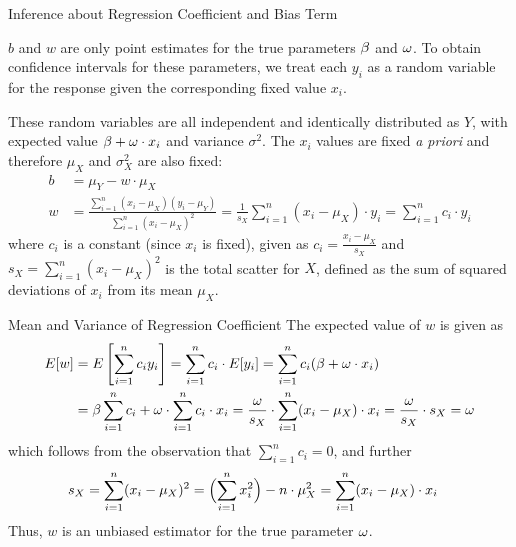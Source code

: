 \begin{frame}{Inference about Regression Coefficient and Bias Term}

$b$ and $w$
are only point estimates for the true parameters $\beta$ and $\omega$. To obtain
confidence intervals for these parameters, we treat each $y_i$ as a
random variable for the response given the corresponding fixed value
$x_i$.

\medskip

These random variables are all independent and identically distributed
as $Y$, with expected value $\beta + \omega \cdot x_i$ and variance
$\sigma^2$. 
	The $x_i$ values are fixed {\em a priori} and
therefore $\mu_X$ and $\sigma_X^2$ are also fixed:%
%
\begin{align*}
    b & = \mu_{Y} - w \cdot \mu_X\\
    w & = \frac{\sum^{n}_{i=1} (x_i - \mu_X)(y_{i}
    - \mu_{Y})}{ \sum^{n}_{i=1} (x_i - \mu_X)^2 } = \frac{1}{s_X} 
    \sum^{n}_{i=1} (x_i - \mu_X) \cdot y_{i}
        = \sum^{n}_{i=1} c_i \cdot y_i
\end{align*}
where $c_i$ is a constant (since $x_i$ is fixed), given as
$    c_i = \frac{x_i - \mu_X}{ s_X }$
and $s_X = \sum^{n}_{i=1} (x_i - \mu_X)^2$ is the total
scatter for $X$, defined as the sum of squared deviations of $x_i$ from
its mean $\mu_X$.
\end{frame}
%
\begin{frame}{Mean and Variance of Regression Coefficient}
The expected value of $w$ is given as
\begin{align*}
E[w] & = E\left[ \sum^{n}_{i=1} c_i y_i \right] = \sum^{n}_{i=1} c_i \cdot
    E[y_i] = \sum^{n}_{i=1} c_i (\beta+\omega\cdot x_i) \\
    & = \beta \sum^{n}_{i=1} c_i + \omega \cdot \sum^{n}_{i=1} c_i \cdot x_i
    = \frac{\omega}{s_X} \cdot \sum^{n}_{i=1} (x_i - \mu_X) \cdot x_i
    = \frac{\omega}{s_X} \cdot s_X = \omega
\end{align*}
which follows from the observation that $ \sum^{n}_{i=1} c_i = 0$, and
further
\begin{align*}
s_X & = \sum^{n}_{i=1} (x_i - \mu_X)^2  
= \Bigl(\sum_{i=1}^n x_i^2\Bigr) - n \cdot \mu_X^2
      = \sum^{n}_{i=1} (x_i - \mu_X) \cdot x_i
\end{align*}
Thus, $w$ is an unbiased estimator for the true parameter $\omega$.
\end{frame}

